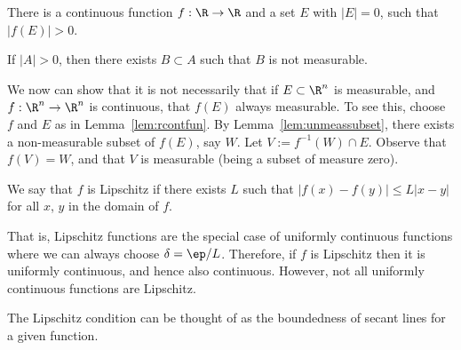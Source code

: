 \begin{lem} \label{lem:rcontfun}
There is a continuous function $f: \R \to \R$ and a set $E$ with $|E|=0$, such that $|f(E)|>0$.
\end{lem}

\pfsk 







\begin{lem} \label{lem:unmeassubset}
If $|A|>0$, then there exists $B \subset A$ such that $B$ is not measurable. 
\end{lem}




We now can show that it is not necessarily that if $E \subset \R^n$ is measurable, and $f: \R^n \to \R^n$ is continuous, that $f(E)$ always measurable. To see this, choose $f$ and $E$ as in Lemma~\ref{lem:rcontfun}. By Lemma~\ref{lem:unmeassubset}, there exists a non-measurable subset of $f(E)$, say $W$. Let $V:= f^{-1}(W) \cap E$. Observe that $f(V)=W$, and that $V$ is measurable (being a subset of measure zero). 

\begin{dfn}[Lipschitz]
We say that $f$ is Lipschitz if there exists $L$ such that $|f(x)-f(y)| \leq L|x-y|$ for all $x$, $y$ in the domain of $f$. 
\end{dfn}

That is, Lipschitz functions are the special case of uniformly continuous functions where we can always choose $\delta=\ep/L$. Therefore, if $f$ is Lipschitz then it is uniformly continuous, and hence also continuous. However, not all uniformly continuous functions are Lipschitz. 


The Lipschitz condition can be thought of as the boundedness of secant lines for a given function. 

